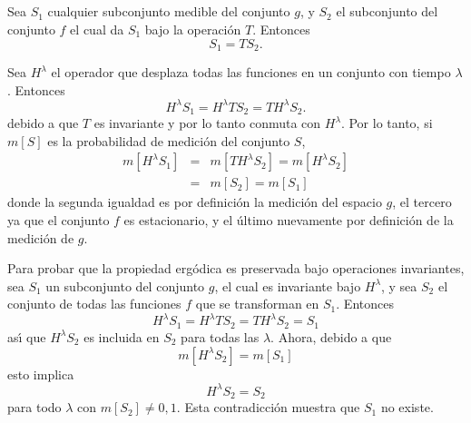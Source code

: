 \begin{appendices}

\chapter{}
\label{a:5}

Sea $S_{1}$ cualquier subconjunto medible del conjunto $g$, y $S_{2}$
el subconjunto del conjunto $f$ el cual da $S_{1}$ bajo la operaci\'on
$T$. Entonces
\begin{equation} S_{1} = TS_{2}.\end{equation}

Sea $H^{\lambda}$ el operador que desplaza todas las funciones en un
conjunto con tiempo $\lambda$. Entonces
\begin{equation} 
H^{\lambda} S_{1} = H^{\lambda} T S_{2} = T H^{\lambda} S_{2}. 
\end{equation}
debido a que $T$ es invariante y por lo tanto conmuta con
$H^{\lambda}$. Por lo tanto, si $m[S]$ es la probabilidad de
medici\'on del conjunto $S$,
\begin{equation} 
\begin{array}{rcl}
m[H^{\lambda} S_{1}] &=& m[T H^{\lambda} S_{2}] = m[H^{\lambda} S_{2}] \\
&=& m[S_{2}] = m[S_{1}]
\end{array}
\end{equation}
donde la segunda igualdad es por definici\'on la medici\'on del
espacio $g$, el tercero ya que el conjunto $f$ es estacionario, y el
\'ultimo nuevamente por definici\'on de la medici\'on de $g$.

Para probar que la propiedad ergódica es preservada bajo operaciones
invariantes, sea $S_{1}$ un subconjunto del conjunto $g$, el cual es
invariante bajo $H^{\lambda}$, y sea $S_{2}$ el conjunto de todas las
funciones $f$ que se transforman en $S_{1}$. Entonces
\begin{equation} H^{\lambda} S_{1} = H^{\lambda} T S_{2} = T H^{\lambda} S_{2} = S_{1} \end{equation}
as\'{\i} que $H^{\lambda} S_{2}$ es incluida en $S_{2}$ para todas las
$\lambda$. Ahora, debido a que
\begin{equation} m[H^{\lambda} S_{2}] = m[S_{1}] \end{equation}
esto implica
\begin{equation} H^{\lambda} S_{2} = S_{2} \end{equation}
para todo $\lambda$ con $m[S_{2}] \neq 0, 1$. Esta contradicci\'on muestra que $S_{1}$ no existe.


\end{appendices}
